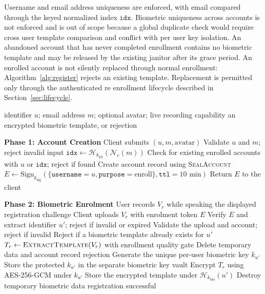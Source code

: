 \documentclass[runningheads]{llncs}
\begin{document}
Username and email address uniqueness are enforced, with email compared through the keyed normalized index $\texttt{idx}$. Biometric uniqueness across accounts is not enforced and is out of scope because a global duplicate check would require cross user template comparison and conflict with per user key isolation. An abandoned account that has never completed enrollment contains no biometric template and may be released by the existing janitor after its grace period. An enrolled account is not silently replaced through normal enrollment: Algorithm~\ref{alg:register} rejects an existing template. Replacement is permitted only through the authenticated re enrollment lifecycle described in Section~\ref{sec:lifecycle}.

{\color{black}
\begin{algorithm}[H]
\caption{\textcolor{black}{User Registration / Enrolment}}\label{alg:register}
\begin{algorithmic}[1]
\small
\Require identifier $u$; email address $m$; optional avatar; live recording capability
\Ensure an encrypted biometric template, or rejection

\State \textbf{Phase 1: Account Creation}
\State Client submits $(u,m,\text{avatar})$
\State Validate $u$ and $m$; reject invalid input
\State $\texttt{idx} \gets \mathcal{H}_{k_{\text{pii}}}(\mathcal{N}_e(m))$
\State Check for existing enrolled accounts with $u$ or $\texttt{idx}$; reject if found
\State Create account record using \textsc{SealAccount}
\State $E \gets \mathrm{Sign}_{k_{\text{sig}}}(\{\texttt{username}=u,\texttt{purpose}=\text{enroll}\},\texttt{ttl}=10\text{ min})$
\State Return $E$ to the client

\State \textbf{Phase 2: Biometric Enrolment}
\State User records $V_r$ while speaking the displayed registration challenge
\State Client uploads $V_r$ with enrolment token $E$
\State Verify $E$ and extract identifier $u'$; reject if invalid or expired
\State Validate the upload and account; reject if invalid
\State Reject if a biometric template already exists for $u'$
\State $T_r \gets \textsc{ExtractTemplate}(V_r)$ with enrollment quality gate
    \State Delete temporary data and account record
    \State \Return rejection
\EndIf
\State Generate the unique per-user biometric key $k_{u'}$
\State Store the protected $k_{u'}$ in the separate biometric key vault
\State Encrypt $T_r$ using AES-256-GCM under $k_{u'}$
\State Store the encrypted template under $\mathcal{H}_{k_{\text{bio}}}(u')$
\State Destroy temporary biometric data
\State \Return registration successful
\end{algorithmic}
\end{algorithm}
}
\end{document}
